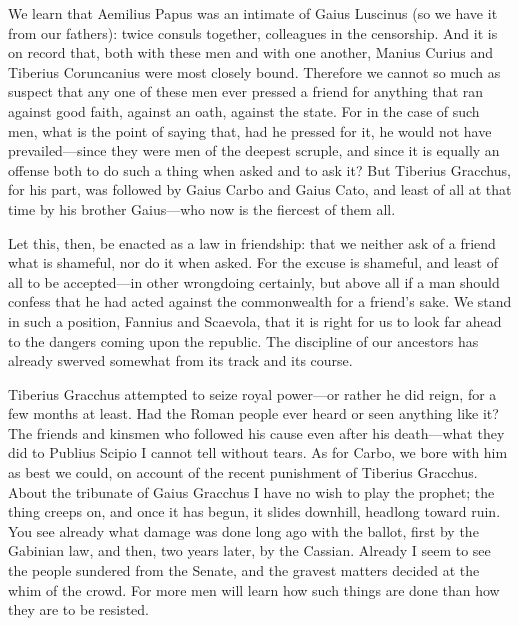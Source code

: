  We learn that Aemilius Papus was an intimate of Gaius Luscinus (so we have it from our fathers): twice consuls together, colleagues in the censorship. And it is on record that, both with these men and with one another, Manius Curius and Tiberius Coruncanius were most closely bound. Therefore we cannot so much as suspect that any one of these men ever pressed a friend for anything that ran against good faith, against an oath, against the state. For in the case of such men, what is the point of saying that, had he pressed for it, he would not have prevailed—since they were men of the deepest scruple, and since it is equally an offense both to do such a thing when asked and to ask it? But Tiberius Gracchus, for his part, was followed by Gaius Carbo and Gaius Cato, and least of all at that time by his brother Gaius—who now is the fiercest of them all.

 Let this, then, be enacted as a law in friendship: that we neither ask of a friend what is shameful, nor do it when asked. For the excuse is shameful, and least of all to be accepted—in other wrongdoing certainly, but above all if a man should confess that he had acted against the commonwealth for a friend's sake. We stand in such a position, Fannius and Scaevola, that it is right for us to look far ahead to the dangers coming upon the republic. The discipline of our ancestors has already swerved somewhat from its track and its course.

 Tiberius Gracchus attempted to seize royal power—or rather he did reign, for a few months at least. Had the Roman people ever heard or seen anything like it? The friends and kinsmen who followed his cause even after his death—what they did to Publius Scipio I cannot tell without tears. As for Carbo, we bore with him as best we could, on account of the recent punishment of Tiberius Gracchus. About the tribunate of Gaius Gracchus I have no wish to play the prophet; the thing creeps on, and once it has begun, it slides downhill, headlong toward ruin. You see already what damage was done long ago with the ballot, first by the Gabinian law, and then, two years later, by the Cassian. Already I seem to see the people sundered from the Senate, and the gravest matters decided at the whim of the crowd. For more men will learn how such things are done than how they are to be resisted.

